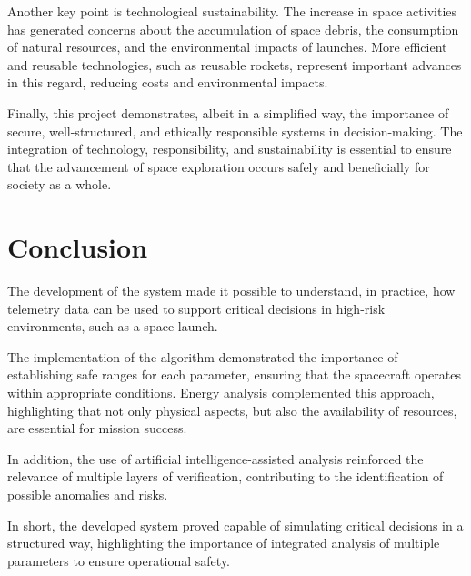\documentclass[12pt]{article}
\begin{document}
Another key point is technological sustainability. The increase in space activities has generated concerns about the accumulation of space debris, the consumption of natural resources, and the environmental impacts of launches. More efficient and reusable technologies, such as reusable rockets, represent important advances in this regard, reducing costs and environmental impacts.

Finally, this project demonstrates, albeit in a simplified way, the importance of secure, well-structured, and ethically responsible systems in decision-making. The integration of technology, responsibility, and sustainability is essential to ensure that the advancement of space exploration occurs safely and beneficially for society as a whole.

\section{Conclusion}

The development of the system made it possible to understand, in practice, how telemetry data can be used to support critical decisions in high-risk environments, such as a space launch.

The implementation of the algorithm demonstrated the importance of establishing safe ranges for each parameter, ensuring that the spacecraft operates within appropriate conditions. Energy analysis complemented this approach, highlighting that not only physical aspects, but also the availability of resources, are essential for mission success.

In addition, the use of artificial intelligence-assisted analysis reinforced the relevance of multiple layers of verification, contributing to the identification of possible anomalies and risks.

In short, the developed system proved capable of simulating critical decisions in a structured way, highlighting the importance of integrated analysis of multiple parameters to ensure operational safety.
\end{document}
